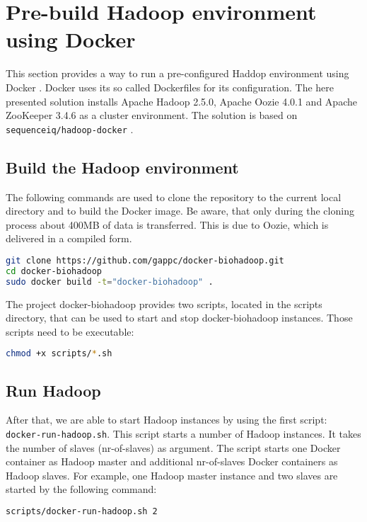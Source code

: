 \section{Pre-build Hadoop environment using Docker}
\label{chap:appendix:biohadoop-docker}
This section provides a way to run a pre-configured Haddop environment using Docker \cite{docker}. Docker uses its so called Dockerfiles for its configuration. The here presented solution installs Apache Hadoop 2.5.0, Apache Oozie 4.0.1 and Apache ZooKeeper 3.4.6 as a cluster environment. The solution is based on \texttt{sequenceiq/hadoop-docker} \cite{docker-sequenceiq}.

\subsection{Build the Hadoop environment}
The following commands are used to clone the repository to the current local directory and to build the Docker image. Be aware, that only during the cloning process about 400MB of data is transferred. This is due to Oozie, which is delivered in a compiled form.
\begin{lstlisting}[language=bash]
git clone https://github.com/gappc/docker-biohadoop.git
cd docker-biohadoop
sudo docker build -t="docker-biohadoop" .
\end{lstlisting}

The project docker-biohadoop provides two scripts, located in the scripts directory, that can be used to start and stop docker-biohadoop instances. Those scripts need to be executable:

\begin{lstlisting}[language=bash]
chmod +x scripts/*.sh
\end{lstlisting}

\subsection{Run Hadoop}
After that, we are able to start Hadoop instances by using the first script: \texttt{docker-run-hadoop.sh}. This script starts a number of Hadoop instances. It takes the number of slaves (nr-of-slaves) as argument. The script starts one Docker container as Hadoop master and additional nr-of-slaves Docker containers as Hadoop slaves. For example, one Hadoop master instance and two slaves are started by the following command:

\begin{lstlisting}[language=bash]
scripts/docker-run-hadoop.sh 2
\end{lstlisting}

